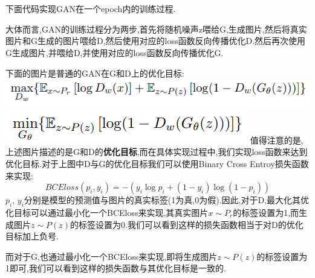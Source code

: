 \documentclass[11pt]{article}
\makeatletter
\def\maxwidth{\ifdim\Gin@nat@width>\linewidth\linewidth
    \else\Gin@nat@width\fi}
\let\Oldincludegraphics\includegraphics
\renewcommand{\includegraphics}[1]{\Oldincludegraphics[width=.8\maxwidth]{#1}}
\makeatother
\begin{document}
    \begin{center}
    \end{center}
    { \hspace*{\fill} \\}
    
    \begin{center}
    \end{center}
    { \hspace*{\fill} \\}
    
    下面代码实现GAN在一个epoch内的训练过程.

大体而言,GAN的训练过程分为两步,首先将随机噪声z喂给G,生成图片,然后将真实图片和G生成的图片喂给D,然后使用对应的loss函数反向传播优化D.然后再次使用G生成图片,并喂给D,并使用对应的loss函数反向传播优化G.

下面的图片是普通的GAN在G和D上的优化目标:
\includegraphics{./pictures/gan_d.png}
\includegraphics{./pictures/gan_g.png}
值得注意的是,上述图片描述的是G和D的\textbf{优化目标},而在具体实现过程中,我们实现loss函数来达到优化目标.对于上图中D与G的优化目标我们可以使用Binary
Cross Entroy损失函数来实现: \[
BCEloss(p_i,y_i)= -(y_i\log{p_i}+(1−y_i)\log{(1−p_i)})
\] \(p_i\),
\(y_i\)分别是模型的预测值与图片的真实标签(1为真,0为假).因此,对于D,最大化其优化目标可以通过最小化一个BCEloss来实现,其真实图片\(x\sim{P_r}\)的标签设置为1,而生成图片\(z\sim{P(z)}\)的标签设置为0.我们可以看到这样的损失函数相当于对D的优化目标加上负号.

而对于G,也通过最小化一个BCEloss来实现,即将生成图片\(z\sim{P(z)}\)的标签设置为1即可,我们可以看到这样的损失函数与其优化目标是一致的.
\end{document}
